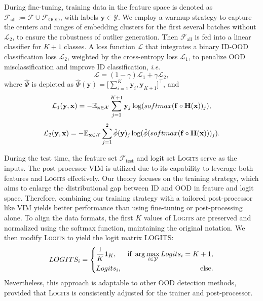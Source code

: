 \documentclass{article}
\theoremstyle{plain}
\theoremstyle{definition}
\theoremstyle{remark}
\begin{document}
During fine-tuning, training data in the feature space is denoted as $\mathcal{F}_{\text{all}}:= \mathcal{F} \cup \mathcal{F}_{\text{OOD}}$, with labels $\mathbf{y} \in \mathcal{Y}$.
%
We employ a warmup strategy to capture the centers and ranges of embedding clusters for the first several batches without $\mathcal{L}_2$, to ensure the robustness of outlier generation. Then $\mathcal{F}_{\text{all}}$ is fed into a linear classifier for $K+1$ classes.
A loss function $\mathcal{L}$ that integrates a binary ID-OOD classification loss $\mathcal{L}_2$, weighted by the cross-entropy loss $\mathcal{L}_1$, to penalize OOD misclassification and improve ID classification,
\textit{i}.\textit{e}. 
\begin{equation}
    \mathcal{L} = (1-\gamma) \mathcal{L}_1 + \gamma \mathcal{L}_2,
    \label{eq: L}
\end{equation}
where $\hat{\Phi}$ is depicted as $\hat{\Phi}(\mathbf{y})=\bigl[\sum_{i=1}^K\mathbf{y}_i, \mathbf{y}_{K+1}\bigr]^{\top}$, and
\begin{equation}
    \mathcal{L}_1(\mathbf{y}, \mathbf{x}) = -\mathbb{E}_{\mathbf{x}\in \mathcal{X}} \sum_{j=1}^{K+1} \mathbf{y}_j \log({\rm softmax}(\mathbf{f}\circ\mathbf{H}(\mathbf{x}))_{j}),
\end{equation}
\begin{equation}
    \mathcal{L}_2(\mathbf{y}, \mathbf{x}) = 
    -\mathbb{E}_{\mathbf{x}\in \mathcal{X}} \sum_{j=1}^{2}\hat{\phi}(\mathbf{y} )_j\log(\hat{\phi}({\rm softmax}(\mathbf{f}\circ\mathbf{H}(\mathbf{x})))_{j}).
    \label{eq: L2}
\end{equation}


During the test time, the feature set $\mathcal{F}_{\text{test}}$ and logit set \textsc{Logits} serve as the inputs. 
%
The post-processor \textsc{VIM} is utilized due to its capability to leverage both features and \textsc{Logits} effectively. 
Our theory focuses on the training strategy, which aims to enlarge the distributional gap between ID and OOD in feature and logit space. Therefore, combining our training strategy with a tailored post-processor like VIM yields better performance than using fine-tuning or post-processing alone.
%
To align the data formats, the first $K$ values of \textsc{Logits} are preserved and normalized using the softmax function, maintaining the original notation. 
%
We then modify \textsc{Logits} to yield the logit matrix \textsc{LOGITS}:
\begin{equation}
    \textsc{LOGITS}_i = \left\{
            \begin{aligned}
            &\frac{1}{K}\mathbf{1}_K, &\text{if}~\arg\max_{i\in \mathcal{Y}}\textsc{Logits}_i=K+1, \\
            &\textsc{Logits}_i, &\text{else}.
            \end{aligned}
            \right.
            \label{eq: 35}
\end{equation}
Nevertheless, this approach is adaptable to other OOD detection methods, provided that \textsc{Logits} is consistently adjusted for the trainer and post-processor.
\end{document}
